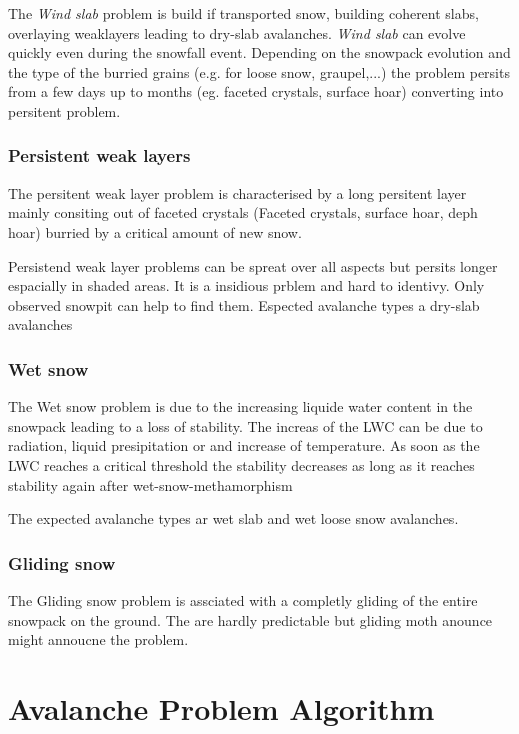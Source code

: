 \noindent The \textit{Wind slab} problem is build if transported snow, building coherent slabs, overlaying weaklayers leading to dry-slab 
avalanches. \textit{Wind slab} can evolve quickly even during the snowfall event. 
Depending on the snowpack evolution and the type of the burried grains (e.g. for loose snow, graupel,...) 
the problem persits from a few days up to months (eg. faceted crystals, surface hoar) converting into persitent problem.

\subsubsection{Persistent weak layers}

The persitent weak layer problem is characterised by a long persitent layer mainly consiting out of faceted crystals
(Faceted crystals, surface hoar, deph hoar) burried by a critical amount of new snow.

Persistend weak layer problems can be spreat over all aspects but persits longer espacially in shaded areas. It is a
insidious prblem and hard to identivy. Only observed snowpit can help to find them. Espected avalanche types a dry-slab avalanches


\subsubsection{Wet snow}

The Wet snow problem is due to the increasing liquide water content in the snowpack leading to a loss of stability.
The increas of the LWC can be due to radiation, liquid presipitation or and increase of temperature. As soon as the LWC 
reaches a critical threshold the stability decreases as long as it reaches stability again after wet-snow-methamorphism

The expected avalanche types ar wet slab and wet loose snow avalanches.

\subsubsection{Gliding snow}

The Gliding snow problem is assciated with a completly gliding of the entire snowpack on the ground. The are hardly 
predictable but  gliding moth anounce might annoucne the problem.


\section{Avalanche Problem Algorithm}

